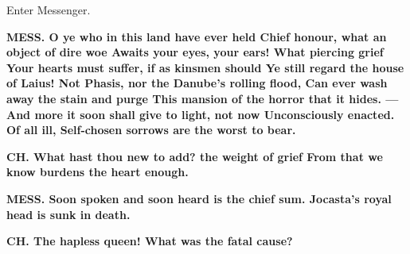 \documentclass[11pt,letter]{book}
\begin{document}
\par  Enter Messenger.

\par \textbf{MESS. O ye who in this land have ever held Chief honour, what an object of dire woe Awaits your eyes, your ears! What piercing grief Your hearts must suffer, if as kinsmen should Ye still regard the house of Laius! Not Phasis, nor the Danube’s rolling flood, Can ever wash away the stain and purge This mansion of the horror that it hides. —And more it soon shall give to light, not now Unconsciously enacted. Of all ill, Self-chosen sorrows are the worst to bear.}
\par 

\par \textbf{CH. What hast thou new to add? the weight of grief From that we know burdens the heart enough.}
\par 

\par \textbf{MESS. Soon spoken and soon heard is the chief sum. Jocasta’s royal head is sunk in death.}
\par 

\par \textbf{CH. The hapless queen! What was the fatal cause?}
\par 
\end{document}
